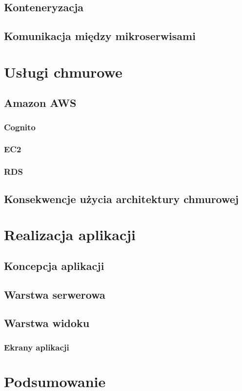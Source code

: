 \documentclass{article}
\begin{document}
	\subsection{Konteneryzacja}
	\subsection{Komunikacja między mikroserwisami}
	
	
\section{Usługi chmurowe}
	\subsection{Amazon AWS}
		\subsubsection{Cognito}
		\subsubsection{EC2}
		\subsubsection{RDS}
	\subsection{Konsekwencje użycia architektury chmurowej}
\section{Realizacja aplikacji}
	\subsection{Koncepcja aplikacji}
	\subsection{Warstwa serwerowa}
	\subsection{Warstwa widoku}
		\subsubsection{Ekrany aplikacji}

\section{Podsumowanie}
\end{document}
